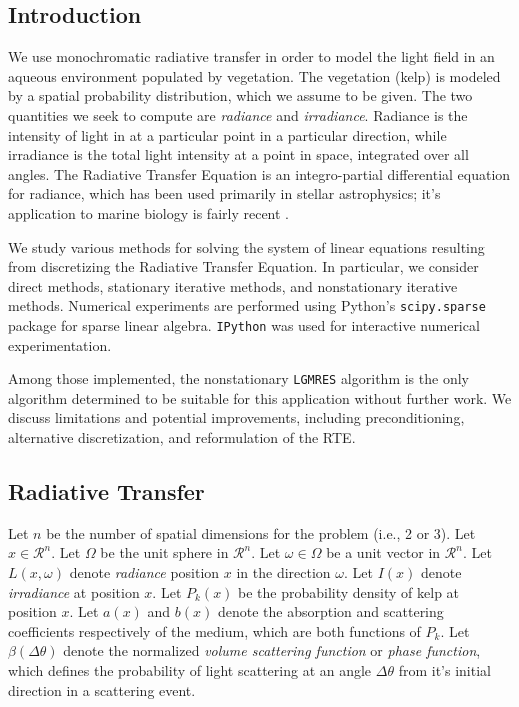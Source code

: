 \documentclass[10pt]{article}
\newcommand\RR{\mathcal{R}}
\begin{document}
\begin{multicols}{2}

\section{Introduction}
We use monochromatic radiative transfer in order to model the light field in an aqueous environment populated by vegetation.
The vegetation (kelp) is modeled by a spatial probability distribution, which we assume to be given.
The two quantities we seek to compute are \textit{radiance} and \textit{irradiance}.
Radiance is the intensity of light in at a particular point in a particular direction, while irradiance is the total light intensity at a point in space, integrated over all angles.
The Radiative Transfer Equation is an integro-partial differential equation for radiance, which has been used primarily in stellar astrophysics; it's application to marine biology is fairly recent \citep{mobley_radiative_2001}.

We study various methods for solving the system of linear equations resulting from discretizing the Radiative Transfer Equation.
In particular, we consider direct methods, stationary iterative methods, and nonstationary iterative methods.
Numerical experiments are performed using Python's \texttt{scipy.sparse} \citep{jones_scipy:_2001} package for sparse linear algebra.
\texttt{IPython} \citep{perez_ipython:_2007} was used for interactive numerical experimentation.

Among those implemented, the nonstationary \texttt{LGMRES} \citep{baker_technique_2005} algorithm is the only algorithm determined to be suitable for this application without further work.
We discuss limitations and potential improvements, including preconditioning, alternative discretization, and reformulation of the RTE.

\subsection{Radiative Transfer}
Let $n$ be the number of spatial dimensions for the problem (i.e., 2 or 3).
Let $x \in \RR^n$.
Let $\Omega$ be the unit sphere in $\RR^n$.
Let $\omega \in \Omega$ be a unit vector in $\RR^n$.
Let $L(x,\omega)$ denote \textit{radiance} position $x$ in the direction $\omega$.
Let $I(x)$ denote \textit{irradiance} at position $x$.
Let $P_k(x)$ be the probability density of kelp at position $x$.
Let $a(x)$ and $b(x)$ denote the absorption and scattering coefficients respectively of the medium, which are both functions of $P_k$.
Let $\beta(\Delta\theta)$ denote the normalized \textit{volume scattering function} or \textit{phase function}, which defines the probability of light scattering at an angle $\Delta\theta$ from it's initial direction in a scattering event.


\end{multicols}
\end{document}
